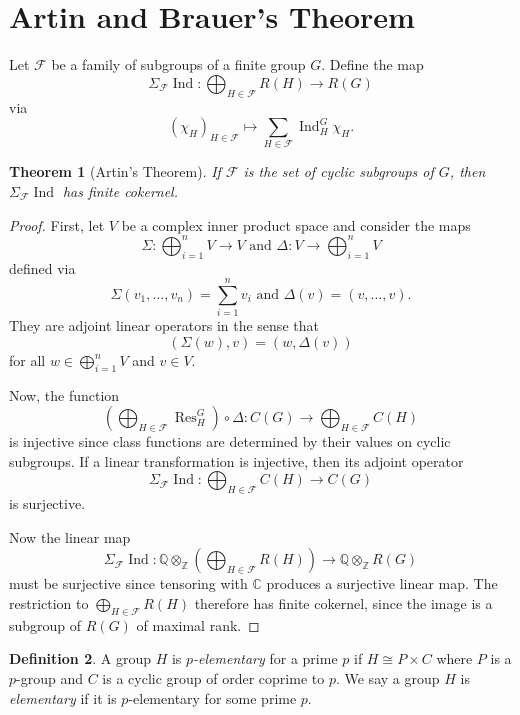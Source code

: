 \documentclass[12pt]{article}
\theoremstyle{plain}
\newtheorem{theorem}{Theorem}[section]
\theoremstyle{definition}
\newtheorem{definition}[theorem]{Definition}
\theoremstyle{remark}
\numberwithin{equation}{section}
\begin{document}
\section{Artin and Brauer's Theorem}

Let $\mathcal{F}$ be a family of subgroups of a finite group $G$.
Define the map
\[
\Sigma_{\mathcal{F}} \operatorname{Ind} :
\bigoplus_{H \in \mathcal{F}} R(H) \to R(G)
\]
via
\[
(\chi_H)_{H \in \mathcal{F}} \mapsto \sum_{H \in \mathcal{F}}
\operatorname{Ind}_H^G \chi_H .
\]

\begin{theorem}[Artin's Theorem]
If $\mathcal{F}$ is the set of cyclic subgroups of $G$,
then $\Sigma_{\mathcal{F}} \operatorname{Ind}$ has finite cokernel.
\end{theorem}

\begin{proof}
First, let $V$ be a complex inner product space and consider the maps
\[
\Sigma : \bigoplus_{i=1}^n V \to V \textrm{ and }
\Delta : V \to \bigoplus_{i=1}^n V
\]
defined via
\[
\Sigma\left(v_1,\ldots,v_n\right) = \sum_{i=1}^n v_i \textrm{ and }
\Delta(v) = (v,\ldots,v).
\]
They are adjoint linear operators in the sense that
\[
\left( \Sigma(w), v \right) = \left( w, \Delta(v) \right)
\]
for all $w \in \bigoplus_{i=1}^n V$ and $v \in V$.

Now, the function
\[
\left( \bigoplus_{H \in \mathcal{F}} \operatorname{Res}^G_H \right)
\circ \Delta: C(G) \to \bigoplus_{H \in \mathcal{F}} C(H)
\]
is injective since class functions are determined by their values on
cyclic subgroups.
If a linear transformation is injective, then its adjoint operator
\[
\Sigma_{\mathcal{F}} \operatorname{Ind} :
\bigoplus_{H \in \mathcal{F}} C(H) \to C(G)
\]
is surjective.

Now the linear map
\[
\Sigma_{\mathcal{F}} \operatorname{Ind} :
\mathbb{Q} \otimes_{\mathbb{Z}}
\left(\bigoplus_{H \in \mathcal{F}} R(H)\right)
\to \mathbb{Q} \otimes_{\mathbb{Z}} R(G)
\]
must be surjective since tensoring with $\mathbb{C}$ produces a
surjective linear map.
The restriction to $\bigoplus_{H \in \mathcal{F}} R(H)$
therefore has finite cokernel, since the image is a subgroup of $R(G)$
of maximal rank.
\end{proof}

\begin{definition}
A group $H$ is \emph{$p$-elementary} for a prime $p$ if
$H \cong P \times C$ where $P$ is a $p$-group and $C$ is a cyclic group
of order coprime to $p$.
We say a group $H$ is \emph{elementary} if it is $p$-elementary for some
prime $p$.
\end{definition}
\end{document}
